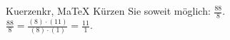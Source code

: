 \begin{MAufgabe}{Kuerzen}{kr, MaTeX}
K\"urzen Sie soweit m\"oglich: $\frac{88}{8}$.\\ 
\ifLsg\MLoesung
\quad $\frac{88}{8}=\frac{(8)\cdot(11)}{(8)\cdot(1)}=\frac{11}{1}$.\else\relax\fi
 \end{MAufgabe}